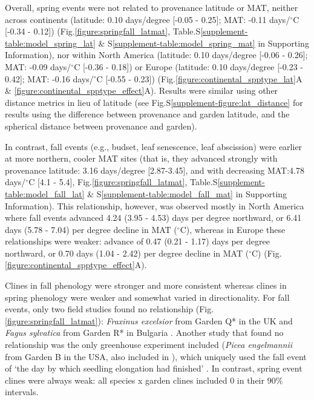 \documentclass{article}
\begin{document}
Overall, spring events were not related to provenance latitude or MAT, neither across continents (latitude: 0.10 days/degree [-0.05 - 0.25]; MAT: -0.11 days/$^{\circ}$C [-0.34 - 0.12]) (Fig.\ref{figure:springfall_latmat}, Table.S\ref{supplement-table:model_spring_lat} \& S\ref{supplement-table:model_spring_mat} in Supporting Information), nor within North America (latitude: 0.10 days/degree [-0.06 - 0.26]; MAT: -0.09 days/$^{\circ}$C [-0.36 - 0.18]) or Europe (latitude: 0.10 days/degree [-0.23 - 0.42]; MAT: -0.16 days/$^{\circ}$C [-0.55 - 0.23]) (Fig.\ref{figure:continental_spptype_lat}A \& \ref{figure:continental_spptype_effect}A). Results were similar using other distance metrics in lieu of latitude (see Fig.S\ref{supplement-figure:lat_distance} for results using the difference between provenance and garden latitude, and the spherical distance between provenance and garden).



In contrast, fall events (e.g., budset, leaf senescence, leaf abscission) were earlier at more northern, cooler MAT sites (that is, they advanced strongly with provenance latitude: 3.16 days/degree [2.87-3.45], and with decreasing MAT:4.78 days/$^{\circ}$C [4.1 - 5.4], Fig.\ref{figure:springfall_latmat}, Table.S\ref{supplement-table:model_fall_lat} \& S\ref{supplement-table:model_fall_mat} in Supporting Information). This relationship, however, was observed mostly in North America where fall events advanced 4.24 (3.95 - 4.53) days per degree northward, or 6.41 days (5.78 - 7.04) per degree decline in MAT ($^{\circ}$C), whereas in Europe these relationships were weaker: advance of 0.47 (0.21 - 1.17) days per degree northward, or 0.70 days (1.04 - 2.42) per degree decline in MAT ($^{\circ}$C) (Fig.\ref{figure:continental_spptype_effect}A).


Clines in fall phenology were stronger and more consistent whereas clines in spring phenology were weaker and somewhat varied in directionality. For fall events, only two field studies found no relationship (Fig.\ref{figure:springfall_latmat}): \emph{Fraxinus excelsior} from Garden Q* in the UK \citep{rosique22} and \emph{Fagus sylvatica} from Garden R* in Bulgaria \citep{petkova17}. Another study that found no relationship was the only greenhouse experiment included (\emph{Picea engelmannii} from Garden B in the USA, also included in \citealp{AitkenBemmels16}), which uniquely used the fall event of `the day by which seedling elongation had finished' \citep{rehfeldt94}. In contrast, spring event clines were always weak: all species x garden clines included 0 in their 90\% intervals.
\end{document}
